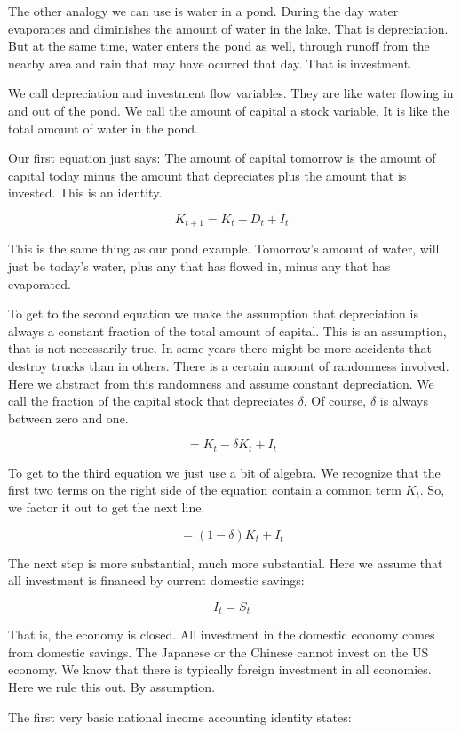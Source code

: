 \documentclass[
]{book}
\begin{document}
The other analogy we can use is water in a pond. During the day water evaporates and diminishes the amount of water in the lake. That is depreciation. But at the same time, water enters the pond as well, through runoff from the nearby area and rain that may have ocurred that day. That is investment.

We call depreciation and investment flow variables. They are like water flowing in and out of the pond. We call the amount of capital a stock variable. It is like the total amount of water in the pond.

Our first equation just says: The amount of capital tomorrow is the amount of capital today minus the amount that depreciates plus the amount that is invested. This is an identity.

\[K_{t+1}=K_t-D_t+I_t\]

This is the same thing as our pond example. Tomorrow's amount of water, will just be today's water, plus any that has flowed in, minus any that has evaporated.

To get to the second equation we make the assumption that depreciation is always a constant fraction of the total amount of capital. This is an assumption, that is not necessarily true. In some years there might be more accidents that destroy trucks than in others. There is a certain amount of randomness involved. Here we abstract from this randomness and assume constant depreciation. We call the fraction of the capital stock that depreciates \(\delta\). Of course, \(\delta\) is always between zero and one.

\[=K_t- \delta K_t+I_t\]

To get to the third equation we just use a bit of algebra. We recognize that the first two terms on the right side of the equation contain a common term \(K_t\). So, we factor it out to get the next line.

\[=(1-\delta) K_t+I_t\]

The next step is more substantial, much more substantial. Here we assume that all investment is financed by current domestic savings:

\[I_t=S_t\]

That is, the economy is closed. All investment in the domestic economy comes from domestic savings. The Japanese or the Chinese cannot invest on the US economy. We know that there is typically foreign investment in all economies. Here we rule this out. By assumption.

The first very basic national income accounting identity states:
\end{document}
